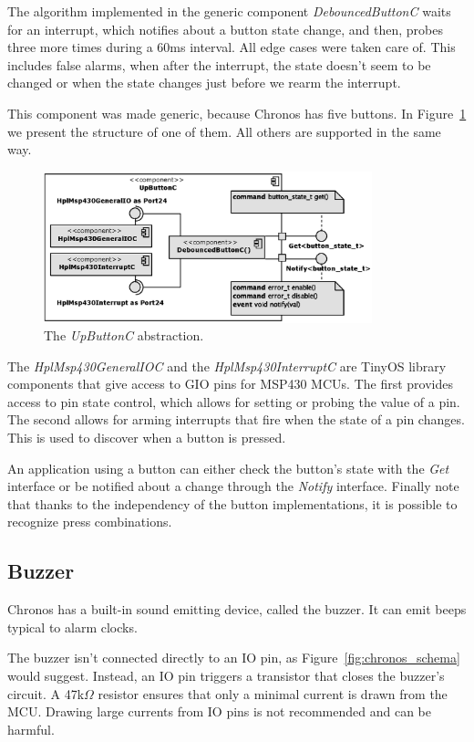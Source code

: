 The algorithm implemented in the generic component \emph{DebouncedButtonC} waits for an interrupt, which notifies about a button state change, and then, probes three more times during a 60ms interval. All edge cases were taken care of. This includes false alarms, when after the interrupt, the state doesn't seem to be changed or when the state changes just before we rearm the interrupt.

This component was made generic, because Chronos has five buttons. In Figure~\ref{fig:UpButtonC} we present the structure of one of them. All others are supported in the same way.

\begin{figure}[h]
  \centering
  \includegraphics[width=0.85\textwidth]{diagrams/UpButtonC.eps}
  \caption{The \emph{UpButtonC} abstraction.}
  \label{fig:UpButtonC}
\end{figure}
The \emph{HplMsp430GeneralIOC} and the \emph{HplMsp430InterruptC} are TinyOS library components that give access to GIO pins for MSP430 MCUs. The first provides access to pin state control, which allows for setting or probing the value of a pin. The second allows for arming interrupts that fire when the state of a pin changes. This is used to discover when a button is pressed.

An application using a button can either check the button's state with the \emph{Get} interface or be notified about a change through the \emph{Notify} interface. Finally note that thanks to the independency of the button implementations, it is possible to recognize press combinations.

\subsection{Buzzer}

Chronos has a built-in sound emitting device, called the buzzer. It can emit beeps typical to alarm clocks.

The buzzer isn't connected directly to an IO pin, as Figure~\ref{fig:chronos_schema} would suggest. Instead, an IO pin triggers a transistor that closes the buzzer's circuit. A 47k$\Omega$ resistor ensures that only a minimal current is drawn from the MCU. Drawing large currents from IO pins is not recommended and can be harmful.

